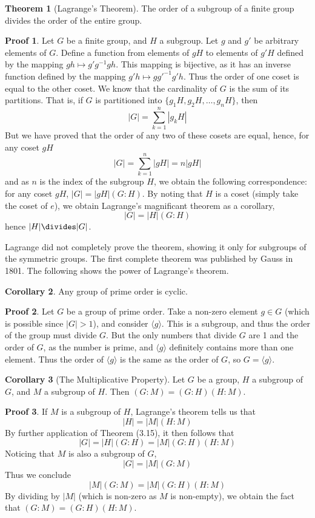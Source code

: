 \documentclass[12pt]{amsbook}
\theoremstyle{definition}
\newtheorem{theorem}{Theorem}[chapter]
\newtheorem{corollary}[theorem]{Corollary}
\newtheorem*{prf}{Proof}
\newcommand{\gen}[1]{\langle #1 \rangle} %
\begin{document}
\begin{theorem}[Lagrange's Theorem] 
    The order of a subgroup of a finite group divides the order of the entire group.
\end{theorem}
\begin{prf}
Let $G$ be a finite group, and $H$ a subgroup. Let $g$ and $g'$ be arbitrary elements of $G$. Define a function from elements of $gH$ to elements of $g'H$ defined by the mapping $gh \mapsto g'g^{-1}gh$. This mapping is bijective, as it has an inverse function defined by the mapping $g'h \mapsto gg'^{-1}g'h$. Thus the order of one coset is equal to the other coset. We know that the cardinality of $G$ is the sum of its partitions. That is, if $G$ is partitioned into $\{ g_1H, g_2H, \dots, g_nH \}$, then
%
\[ |G| = \sum_{k = 1}^n |g_kH| \]
%
But we have proved that the order of any two of these cosets are equal, hence, for any coset $gH$
%
\[ |G| = \sum_{k = 1}^n |gH| = n|gH| \]
%
and as $n$ is the index of the subgroup $H$, we obtain the following correspondence: for any coset $gH$, $|G| = |gH|(G:H)$. By noting that $H$ is a coset (simply take the coset of $e$), we obtain Lagrange's magnificant theorem as a corollary,
%
\[ |G| = |H|(G:H) \]
%
hence $|H| \divides |G|$.
\end{prf}

Lagrange did not completely prove the theorem, showing it only for subgroups of the symmetric groups. The first complete theorem was published by Gauss in 1801. The following shows the power of Lagrange's theorem.

\begin{corollary} Any group of prime order is cyclic. \end{corollary}
\begin{prf}
    Let $G$ be a group of prime order. Take a non-zero element $g \in G$ (which is possible since $|G| > 1$), and consider $\gen{g}$. This is a subgroup, and thus the order of the group must divide $G$. But the only numbers that divide $G$ are 1 and the order of $G$, as the number is prime, and $\gen{g}$ definitely contains more than one element. Thus the order of $\gen{g}$ is the same as the order of $G$, so $G = \gen{g}$.
\end{prf}

\begin{corollary}[The Multiplicative Property] 
    Let $G$ be a group, $H$ a subgroup of $G$, and $M$ a subgroup of $H$. Then $(G:M) = (G:H)(H:M)$.
\end{corollary}
\begin{prf}
    If $M$ is a subgroup of $H$, Lagrange's theorem tells us that
    \[ |H| = |M|(H:M) \]
    By further application of Theorem (3.15), it then follows that
    \[ |G| = |H|(G:H) = |M|(G:H)(H:M) \]
    Noticing that $M$ is also a subgroup of $G$,
    \[ |G| = |M|(G:M) \]
    Thus we conclude
    \[ |M|(G:M) = |M|(G:H)(H:M) \]
    By dividing by $|M|$ (which is non-zero as $M$ is non-empty), we obtain the fact that $(G:M) = (G:H)(H:M)$.
\end{prf}
\end{document}
